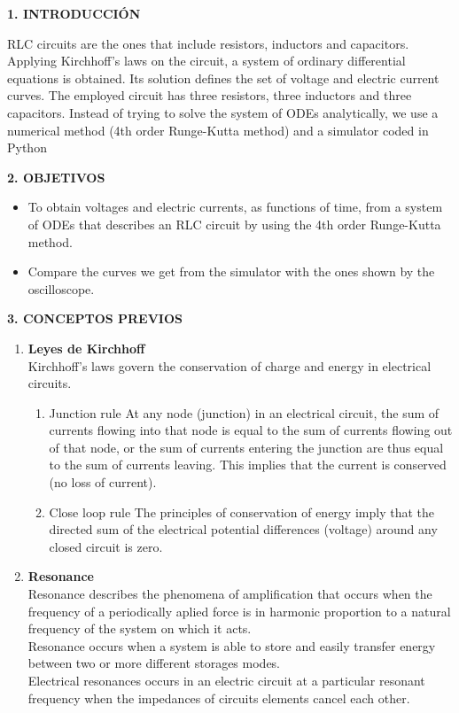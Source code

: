 \documentclass[10pt,a4paper]{article}
\begin{document}
\begin{multicols}{2}
\begin{center}
{\large \bf 1. INTRODUCCI\'ON}
\end{center}
RLC circuits are the ones that include resistors, inductors and 
capacitors. Applying Kirchhoff's laws on the circuit, a system of 
ordinary differential equations is obtained. Its solution defines 
the set of voltage and electric current curves. The employed circuit 
has three resistors, three inductors and three capacitors. Instead of
trying to solve the system of ODEs analytically, we use a numerical 
method (4th order Runge-Kutta method) and a simulator coded in Python

\begin{center}
{\large \bf 2. OBJETIVOS}
\end{center}
\begin{itemize}
\item To obtain voltages and electric currents, as functions of time, from
a system of ODEs that describes an RLC circuit by using the 4th order
Runge-Kutta method.
\item Compare the curves we get from the simulator with the ones shown by
the oscilloscope.
\end{itemize}

\begin{center}
{\large \bf 3. CONCEPTOS PREVIOS}
\end{center}
\begin{enumerate}
\item \textbf{Leyes de Kirchhoff}\\
Kirchhoff’s laws govern the conservation of charge and energy in electrical circuits.
\begin{enumerate}
\item Junction rule
At any node (junction) in an electrical circuit, the sum of currents flowing into that node is equal to the sum of currents flowing out of that node, or the sum of currents entering the junction are thus equal to the sum of currents leaving. This implies that the current is conserved (no loss of current). 
\item Close loop rule
The principles of conservation of energy imply that the directed sum of the electrical potential differences (voltage) around any closed circuit is zero.
\end{enumerate} 

\item \textbf{Resonance}\\
Resonance describes the phenomena of amplification that occurs when the frequency of a periodically aplied force is in harmonic proportion to a natural frequency of the system on which it acts.\\
Resonance occurs when a system is able to store and easily transfer energy between two or more different storages modes.\\
Electrical resonances occurs in an electric circuit at a particular resonant frequency when the impedances of circuits elements cancel each other.


\end{enumerate}
\end{multicols}
\end{document}
